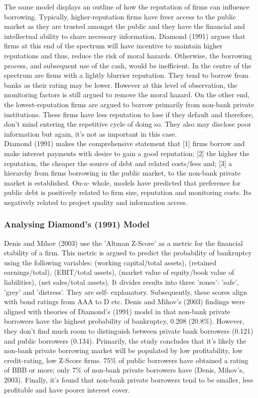 \documentclass[11pt, english]{article}
\begin{document}
	The same model displays an outline of how the reputation of firms can influence borrowing. Typically, higher-reputation firms have freer access to the public market as they are trusted amongst the public and they have the financial and intellectual ability to share necessary information. Diamond (1991) argues that firms at this end of the spectrum will have incentive to maintain higher reputations and thus, reduce the risk of moral hazards. Otherwise, the borrowing process, and subsequent use of the cash, would be inefficient. In the centre of the spectrum are firms with a lightly blurrier reputation. They tend to borrow from banks as their rating may be lower. However at this level of observation, the monitoring factors is still argued to remove the moral hazard. On the other end, the lowest-reputation firms are argued to borrow primarily from non-bank private institutions. These firms have less reputation to lose if they default and therefore, don't mind entering the repetitive cycle of doing so. They also may disclose poor information but again, it's not as important in this case.\\

	Diamond (1991) makes the comprehensive statement that [1] firms borrow and make interest payments with desire to gain a good reputation; [2] the higher the reputation, the cheaper the source of debt and related costs/fees and; [3] a hierarchy from firms borrowing in the public market, to the non-bank private market is established. On-a- whole, models have predicted that preference for public debt is positively related to firm size, reputation and monitoring costs. Its negatively related to project quality and information access.

		\subsubsection*{Analysing Diamond's (1991) Model}

	Denis and Mihov (2003) use the 'Altman Z-Score' as a metric for the financial stability of a firm. This metric is argued to predict the probability of bankruptcy using the following variables: (working capital/total assets), (retained earnings/total), (EBIT/total assets), (market value of equity/book value of liabilities), (net sales/total assets). It divides results into three 'zones': 'safe', 'grey' and 'distress'. They are self- explanatory. Subsequently, these scores align with bond ratings from AAA to D etc. Denis and Mihov's (2003) findings were aligned with theories of Diamond's (1991) model in that non-bank private borrowers have the highest probability of bankruptcy, 0.208 (20.8\%). However, they don't find much room to distinguish between private bank borrowers (0.121) and public borrowers (0.134). Primarily, the study concludes that it's likely the non-bank private borrowing market will be populated by low profitability, low credit-rating, low Z-Score firms. 75\% of public borrowers have obtained a rating of BBB or more; only 7\% of non-bank private borrowers have (Denis, Mihov's, 2003). Finally, it's found that non-bank private borrowers tend to be smaller, less profitable and have poorer interest cover.\\
\end{document}
